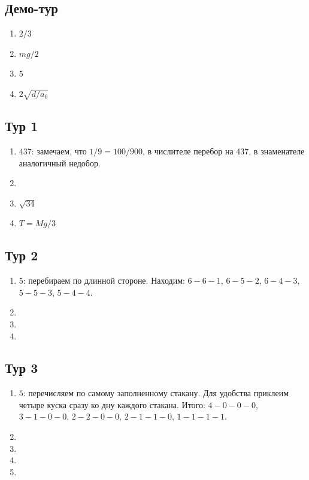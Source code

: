 \documentclass[12pt]{article} %
\begin{document}
\subsection*{Демо-тур}

\begin{enumerate}
\item $2/3$
\item $mg/2$
\item $5$
\item $2\sqrt{d/a_0}$
\end{enumerate}

\subsection*{Тур 1}

\begin{enumerate}
\item $437$: замечаем, что $1/9=100/900$, в числителе перебор на 437, в знаменателе аналогичный недобор.
\item 
\item $\sqrt{34}$
\item $T=Mg/3$
\end{enumerate}

\subsection*{Тур 2}

\begin{enumerate}
\item $5$: перебираем по длинной стороне. Находим: $6-6-1$, $6-5-2$, $6-4-3$, $5-5-3$, $5-4-4$.
\item 
\item 
\item 
\end{enumerate}

\subsection*{Тур 3}

\begin{enumerate}
\item $5$: перечисляем по самому заполненному стакану. Для удобства приклеим четыре куска сразу ко дну каждого стакана. 
Итого: $4-0-0-0$, $3-1-0-0$, $2-2-0-0$, $2-1-1-0$, $1-1-1-1$.
\item 
\item 
\item 
\item 
\end{enumerate}
\end{document}
